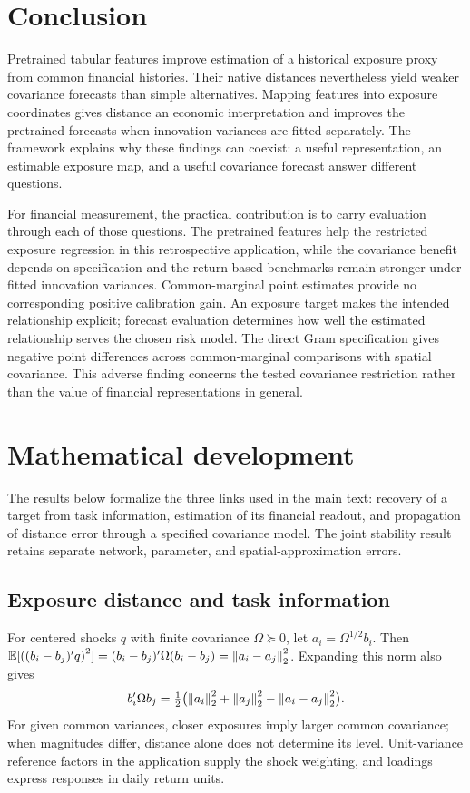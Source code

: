 \documentclass[11pt]{article}
\renewcommand{\lean}[1]{\ignorespaces}
\renewcommand{\leanok}{\ignorespaces}
\begin{document}
\section{Conclusion}
Pretrained tabular features improve estimation of a historical exposure proxy
from common financial histories. Their native distances nevertheless yield
weaker covariance forecasts than simple alternatives. Mapping features into
exposure coordinates gives distance an economic interpretation and improves
the pretrained forecasts when innovation variances are fitted separately. The
framework explains why these findings can coexist: a useful representation,
an estimable exposure map, and a useful covariance forecast answer different
questions.

For financial measurement, the practical contribution is to carry evaluation
through each of those questions. The pretrained features help the restricted
exposure regression in this retrospective application, while the covariance
benefit depends on specification and the return-based benchmarks remain
stronger under fitted innovation variances. Common-marginal point
estimates provide no corresponding positive
calibration gain. An exposure target makes the intended relationship explicit;
forecast evaluation determines how well the estimated relationship serves the
chosen risk model. The direct Gram specification gives \GramNegative{} negative
point differences across \GramComparisons{} common-marginal comparisons with
spatial covariance. This adverse finding concerns the tested covariance
restriction rather than the value of financial representations in general.
\clearpage
\appendix
\section{Mathematical development}\label{sec:theory}
The results below formalize the three links used in the main text: recovery
of a target from task information, estimation of its financial readout, and
propagation of distance error through a specified covariance model.
The joint stability result retains separate network, parameter, and
spatial-approximation errors.
\subsection{Exposure distance and task information}
For centered shocks $q$ with finite covariance $\Omega\succeq0$, let
$a_i=\Omega^{1/2}b_i$. Then
$\mathbb{E}[{((b_i-b_j)'q)}^2]=(b_i-b_j)'\Omega(b_i-b_j)=\left\lVert a_i-a_j\right\rVert_2^2$.
Expanding this norm also gives
\begin{equation}\label{eq:exposure-covariance}
  b_i'\Omega b_j
  =\tfrac12\bigl(\left\lVert a_i\right\rVert_2^2+\left\lVert a_j\right\rVert_2^2-\left\lVert a_i-a_j\right\rVert_2^2\bigr).
\end{equation}
\lean{FreeFoundations.Exposure.covariance_eq,
FreeFoundations.Score.response_sq}\leanok{}
For given common variances, closer exposures imply larger common covariance;
when magnitudes differ, distance alone does not determine its level.
Unit-variance reference factors in the application supply the shock weighting,
and loadings express responses in daily return units.
\end{document}
